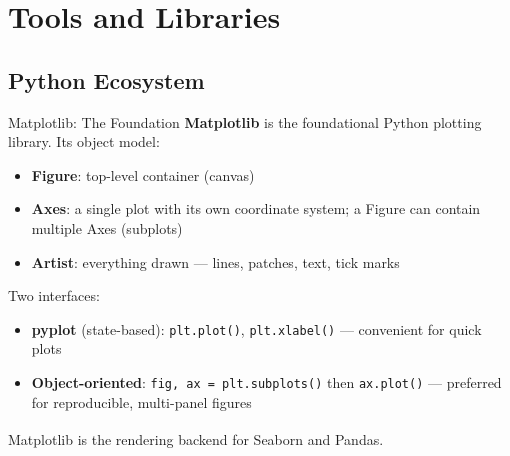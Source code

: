 \section{Tools and Libraries}

\subsection{Python Ecosystem}

\begin{v3topic}{Matplotlib: The Foundation}
    \textbf{Matplotlib} is the foundational Python plotting library. Its object model:
    \begin{itemize}
        \item \textbf{Figure}: top-level container (canvas)
        \item \textbf{Axes}: a single plot with its own coordinate system; a Figure
              can contain multiple Axes (subplots)
        \item \textbf{Artist}: everything drawn --- lines, patches, text, tick marks
    \end{itemize}
    Two interfaces:
    \begin{itemize}
        \item \textbf{pyplot} (state-based): \texttt{plt.plot()}, \texttt{plt.xlabel()} ---
              convenient for quick plots
        \item \textbf{Object-oriented}: \texttt{fig, ax = plt.subplots()} then
              \texttt{ax.plot()} --- preferred for reproducible, multi-panel figures
    \end{itemize}
    Matplotlib is the rendering backend for Seaborn and
    Pandas\textsuperscript{\cite[][pp.~55--80]{molinHandsonDataAnalysis2021}}.

\end{v3topic}

